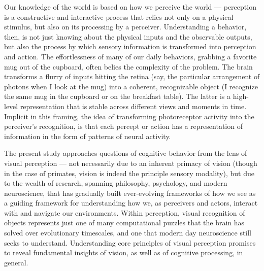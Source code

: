 Our knowledge of the world is based on how we perceive the world --- perception is a constructive and interactive process that relies not only on a physical stimulus, but also on its processing by a perceiver. Understanding a behavior, then, is not just knowing about the physical inputs and the observable outputs, but also the process by which sensory information is transformed into perception and action. The effortlessness of many of our daily behaviors, grabbing a favorite mug out of the cupboard, often belies the complexity of the problem. The brain transforms a flurry of inputs hitting the retina (say, the particular arrangement of photons when I look at the mug) into a coherent, recognizable object (I recognize the same mug in the cupboard or on the breakfast table). The latter is a high-level representation that is stable across different views and moments in time. Implicit in this framing, the idea of transforming photoreceptor activity into the perceiver's recognition, is that each percept or action has a representation of information in the form of patterns of neural activity. 

The present study approaches questions of cognitive behavior from the lens of visual perception --- not necessarily due to an inherent primacy of vision (though in the case of primates, vision is indeed the principle sensory modality), but due to the wealth of research, spanning philosophy, psychology, and modern neuroscience, that has gradually built ever-evolving frameworks of how we see as a guiding framework for understanding how we, as perceivers and actors, interact with and navigate our environments. Within perception, visual recognition of objects represents just one of many computational puzzles that the brain has solved over evolutionary timescales, and one that modern day neuroscience still seeks to understand. Understanding core principles of visual perception promises to reveal fundamental insights of vision, as well as of cognitive processing, in general. 

